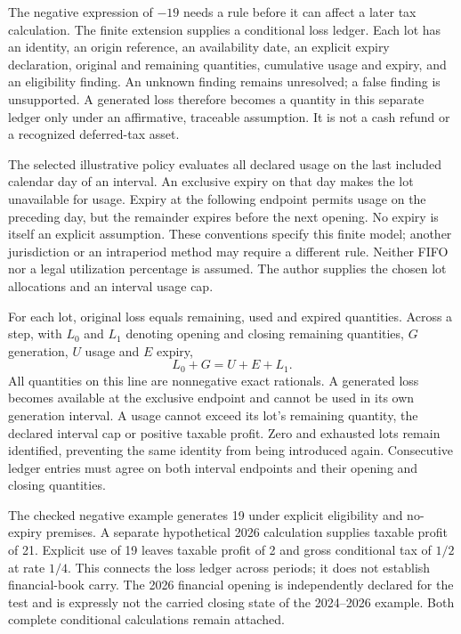 The negative expression of $-19$ needs a rule before it can affect a later
tax calculation. The finite extension supplies a conditional loss ledger.
Each lot has an identity, an origin reference, an availability date, an explicit
expiry declaration, original and remaining quantities, cumulative usage and
expiry, and an eligibility finding. An unknown finding remains unresolved;
a false finding is unsupported. A generated loss therefore becomes a quantity
in this separate ledger only under an affirmative, traceable assumption.
It is not a cash refund or a recognized deferred-tax asset.

The selected illustrative policy evaluates all declared usage on the last
included calendar day of an interval. An exclusive expiry on that day makes
the lot unavailable for usage. Expiry at the following endpoint permits usage
on the preceding day, but the remainder expires before the next opening.
No expiry is itself an explicit assumption. These conventions specify this
finite model; another jurisdiction or an intraperiod method may require a
different rule. Neither FIFO nor a legal utilization percentage is assumed.
The author supplies the chosen lot allocations and an interval usage cap.

For each lot, original loss equals remaining, used and expired quantities.
Across a step, with $L_0$ and $L_1$ denoting opening and closing remaining
quantities, $G$ generation, $U$ usage and $E$ expiry,
\[
 L_0+G=U+E+L_1.
\]
All quantities on this line are nonnegative exact rationals. A generated loss
becomes available at the exclusive endpoint and cannot be used in its own
generation interval. A usage cannot exceed its lot's remaining quantity,
the declared interval cap or positive taxable profit. Zero and exhausted lots
remain identified, preventing the same identity from being introduced again.
Consecutive ledger entries must agree on both interval endpoints and their
opening and closing quantities.

The checked negative example generates 19 under explicit eligibility and
no-expiry premises. A separate hypothetical 2026 calculation supplies taxable
profit of 21. Explicit use of 19 leaves taxable profit of 2 and gross conditional
tax of $1/2$ at rate $1/4$. This connects the loss ledger across periods; it does
not establish financial-book carry. The 2026 financial opening is independently
declared for the test and is expressly not the carried closing state of the
2024--2026 example. Both complete conditional calculations remain attached.

